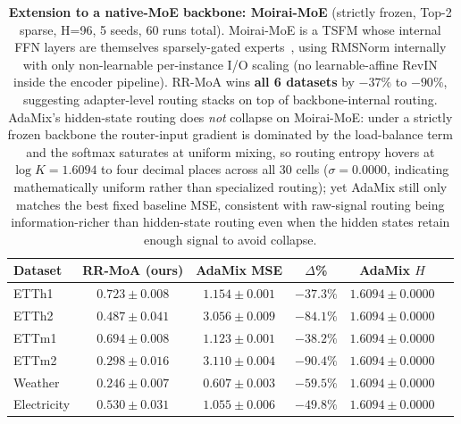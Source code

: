 \documentclass{article}
\begin{document}
\begin{table}[!htbp]
\centering
\caption{\textbf{Extension to a native-MoE backbone: Moirai-MoE} (strictly frozen, Top-2 sparse, H=96, 5 seeds, 60 runs total). Moirai-MoE is a TSFM whose internal FFN layers are themselves sparsely-gated experts~\citep{liu2025moiraimoe}, using RMSNorm internally with only non-learnable per-instance I/O scaling (no learnable-affine RevIN inside the encoder pipeline). RR-MoA wins \textbf{all 6 datasets} by $-37\%$ to $-90\%$, suggesting adapter-level routing stacks on top of backbone-internal routing. AdaMix's hidden-state routing does \emph{not} collapse on Moirai-MoE: under a strictly frozen backbone the router-input gradient is dominated by the load-balance term and the softmax saturates at uniform mixing, so routing entropy hovers at $\log K = 1.6094$ to four decimal places across all 30 cells ($\sigma{=}0.0000$, indicating mathematically uniform rather than specialized routing); yet AdaMix still only matches the best fixed baseline MSE, consistent with raw-signal routing being information-richer than hidden-state routing even when the hidden states retain enough signal to avoid collapse.}
\label{tab:moirai_moe}
\small
\begin{tabular}{@{}lccccc@{}}
\toprule
Dataset & RR-MoA (ours) & AdaMix MSE & $\Delta$\% & AdaMix $H$ \\
\midrule
ETTh1 & $\mathbf{0.723 \pm 0.008}$ & $1.154 \pm 0.001$ & $\mathbf{-37.3\%}$ & $1.6094 \pm 0.0000$ \\
ETTh2 & $\mathbf{0.487 \pm 0.041}$ & $3.056 \pm 0.009$ & $\mathbf{-84.1\%}$ & $1.6094 \pm 0.0000$ \\
ETTm1 & $\mathbf{0.694 \pm 0.008}$ & $1.123 \pm 0.001$ & $\mathbf{-38.2\%}$ & $1.6094 \pm 0.0000$ \\
ETTm2 & $\mathbf{0.298 \pm 0.016}$ & $3.110 \pm 0.004$ & $\mathbf{-90.4\%}$ & $1.6094 \pm 0.0000$ \\
Weather & $\mathbf{0.246 \pm 0.007}$ & $0.607 \pm 0.003$ & $\mathbf{-59.5\%}$ & $1.6094 \pm 0.0000$ \\
Electricity & $\mathbf{0.530 \pm 0.031}$ & $1.055 \pm 0.006$ & $\mathbf{-49.8\%}$ & $1.6094 \pm 0.0000$ \\
\bottomrule
\end{tabular}
\end{table}
\end{document}
